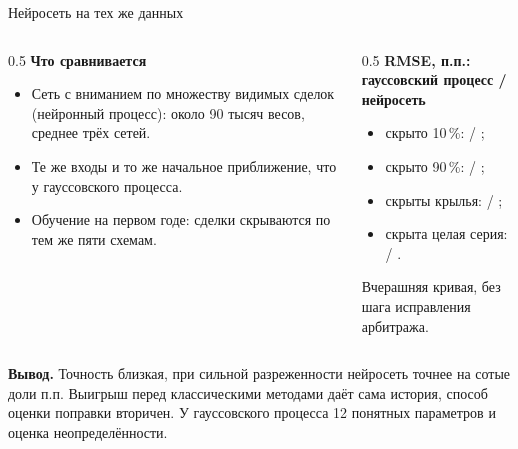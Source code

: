 \documentclass[aspectratio=169]{beamer}
\begin{document}
\begin{frame}{Нейросеть на тех же данных}
    \begin{columns}[T]
    \begin{column}{0.5\textwidth}
        \textbf{Что сравнивается}
        \begin{itemize}
            \item Сеть с вниманием по множеству видимых сделок (нейронный процесс): около 90 тысяч весов, среднее трёх сетей.
            \item Те же входы и то же начальное приближение, что у гауссовского процесса.
            \item Обучение на первом годе: сделки скрываются по тем же пяти схемам.
        \end{itemize}
    \end{column}
    \begin{column}{0.5\textwidth}
        \textbf{RMSE, п.п.: гауссовский процесс / нейросеть}
        \begin{itemize}
            \item скрыто 10\,\%:  / ;
            \item скрыто 90\,\%:  / ;
            \item скрыты крылья:  / ;
            \item скрыта целая серия:  / .
        \end{itemize}
        {\footnotesize Вчерашняя кривая, без шага исправления арбитража.}
    \end{column}
    \end{columns}
    \medskip
    \textbf{Вывод.} Точность близкая, при сильной разреженности нейросеть точнее на сотые доли п.п. Выигрыш перед классическими методами даёт сама история, способ оценки поправки вторичен. У гауссовского процесса 12 понятных параметров и оценка неопределённости.
\end{frame}
\end{document}
